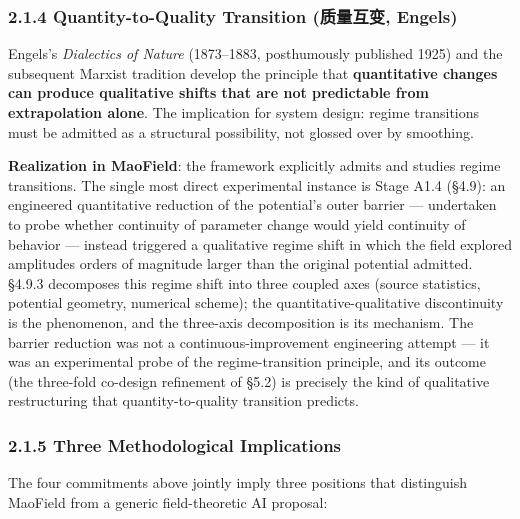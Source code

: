 \documentclass[
]{article}
\begin{document}
\hypertarget{quantity-to-quality-transition-ux8d28ux91cfux4e92ux53d8-engels}{%
\subsubsection{2.1.4 Quantity-to-Quality Transition (质量互变,
Engels)}\label{quantity-to-quality-transition-ux8d28ux91cfux4e92ux53d8-engels}}

Engels's \emph{Dialectics of Nature} (1873--1883, posthumously published
1925) and the subsequent Marxist tradition develop the principle that
\textbf{quantitative changes can produce qualitative shifts that are not
predictable from extrapolation alone}. The implication for system
design: regime transitions must be admitted as a structural possibility,
not glossed over by smoothing.

\textbf{Realization in MaoField}: the framework explicitly admits and
studies regime transitions. The single most direct experimental instance
is Stage A1.4 (§4.9): an engineered quantitative reduction of the
potential's outer barrier --- undertaken to probe whether continuity of
parameter change would yield continuity of behavior --- instead
triggered a qualitative regime shift in which the field explored
amplitudes orders of magnitude larger than the original potential
admitted. §4.9.3 decomposes this regime shift into three coupled axes
(source statistics, potential geometry, numerical scheme); the
quantitative-qualitative discontinuity is the phenomenon, and the
three-axis decomposition is its mechanism. The barrier reduction was not
a continuous-improvement engineering attempt --- it was an experimental
probe of the regime-transition principle, and its outcome (the
three-fold co-design refinement of §5.2) is precisely the kind of
qualitative restructuring that quantity-to-quality transition predicts.

\hypertarget{three-methodological-implications}{%
\subsubsection{2.1.5 Three Methodological
Implications}\label{three-methodological-implications}}

The four commitments above jointly imply three positions that
distinguish MaoField from a generic field-theoretic AI proposal:
\end{document}
